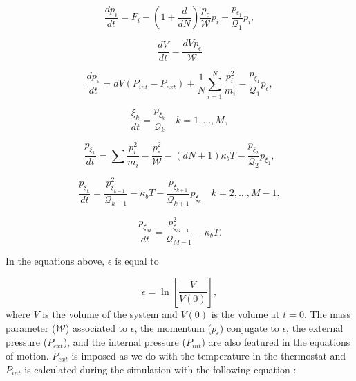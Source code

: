 \begin{equation}
\frac{dp_{i}}{dt} = F_i  - \left(1 + \frac{d}{dN}\right) \frac{p_{\epsilon}}{\mathcal{W}} p_{i} - \frac{p_{\epsilon _{1}}}{\mathcal{Q} _1} p_{i},
\end{equation}

\begin{equation}
\frac{dV}{dt} = \frac{d V p_{\epsilon}}{\mathcal{W} }
\end{equation}

\begin{equation}
\frac{dp_{\epsilon}}{dt} = dV (    P_{int} -P_{ext}) + \frac{1}{N} \sum_{i=1}^{N} \frac{p_{i}^{2}}{m_i} - \frac{p_{\xi _{1}}}{{\mathcal{Q} _1}}p_{\epsilon},
\end{equation}

\begin{equation}
\frac{\xi _{k}}{dt} = \frac{p_{\xi _k}}{\mathcal{Q} _{k}} \quad k = 1,...,M ,
\end{equation}

\begin{equation}
\frac{p_{\xi _1}}{dt} = \sum \frac{p_{i}^{2}}{m_{i}} - \frac{p_{\epsilon}^{2}}{\mathcal{W}} -  (dN +1)\kappa_{b}T -\frac{p_{\xi _{2}}}{\mathcal{Q} _2}p_{\xi _{1}},
\end{equation}

\begin{equation}
\frac{p_{\xi _k}}{dt} = \frac{p_{\xi _{k -1}}^{2}}{\mathcal{Q} _{k-1}} - \kappa_{b}T - \frac{p_{\xi _{k+1}}}{\mathcal{Q} _{k+1}}p_{\xi _{k}} \quad k = 2,...,M-1 ,
\end{equation}

\begin{equation}
\frac{p_{\xi _M}}{dt} = \frac{ p_{\xi _{M-1}}^{2}}{\mathcal{Q} _{M-1}} - \kappa_{b}T .
\end{equation}

In the equations above, $\epsilon$ is equal to

\begin{equation}
\epsilon = \ln \left[\frac{V}{V(0)}\right],
\end{equation}
where $V$ is the volume of the system and $V(0)$ is the volume at $t=0$. The mass parameter ($\mathcal{W}$) associated to $\epsilon$, the momentum ($p_{\epsilon}$) conjugate to $\epsilon$, the external pressure ($P_{ext}$), and the internal pressure ($P_{int}$) are also featured in the equations of motion. $P_{ext}$ is imposed as we do with the temperature in the thermostat and $P_{int}$ is calculated during the simulation with the following equation \cite{tuckerman}:

